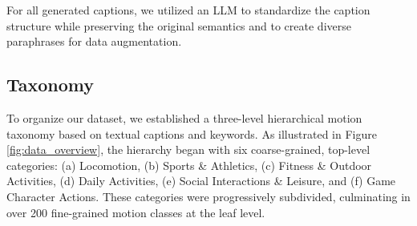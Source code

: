 For all generated captions, we utilized an LLM to standardize the caption structure while preserving the original semantics and to create diverse paraphrases for data augmentation.












\subsection{Taxonomy}
\label{subsec:stats}


To organize our dataset, we established a three-level hierarchical motion taxonomy based on textual captions and keywords. As illustrated in Figure \ref{fig:data_overview}, the hierarchy began with six coarse-grained, top-level categories: (a) Locomotion, (b) Sports \& Athletics, (c) Fitness \& Outdoor Activities, (d) Daily Activities, (e) Social Interactions \& Leisure, and (f) Game Character Actions. These categories were progressively subdivided, culminating in over 200 fine-grained motion classes at the leaf level.












